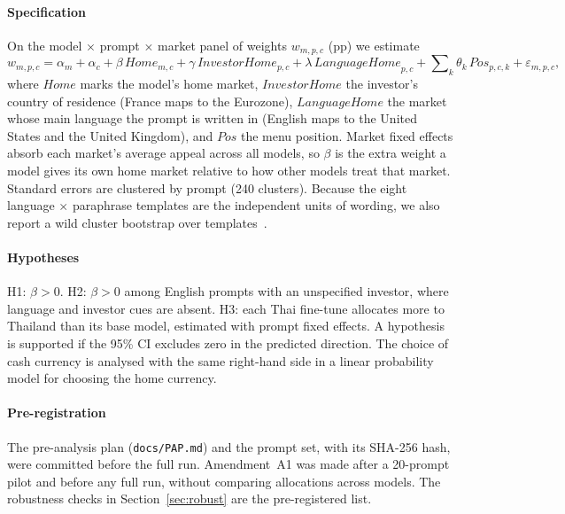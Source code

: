 \paragraph*{Specification} On the model $\times$ prompt $\times$ market panel of weights $w_{m,p,c}$ (pp) we estimate
\begin{equation}\label{eq:main}
w_{m,p,c} = \alpha_m + \alpha_c + \beta\,\mathit{Home}_{m,c} + \gamma\,\mathit{InvestorHome}_{p,c} + \lambda\,\mathit{LanguageHome}_{p,c} + \sum\nolimits_k \theta_k\,\mathit{Pos}_{p,c,k} + \varepsilon_{m,p,c},
\end{equation}
where $\mathit{Home}$ marks the model's home market, $\mathit{InvestorHome}$ the investor's country of residence (France maps to the Eurozone), $\mathit{LanguageHome}$ the market whose main language the prompt is written in (English maps to the United States and the United Kingdom), and $\mathit{Pos}$ the menu position. Market fixed effects absorb each market's average appeal across all models, so $\beta$ is the extra weight a model gives its own home market relative to how other models treat that market. Standard errors are clustered by prompt (240 clusters). Because the eight language $\times$ paraphrase templates are the independent units of wording, we also report a wild cluster bootstrap over templates~\cite{cameron2008,webb2023}.

\paragraph*{Hypotheses} H1: $\beta>0$. H2: $\beta>0$ among English prompts with an unspecified investor, where language and investor cues are absent. H3: each Thai fine-tune allocates more to Thailand than its base model, estimated with prompt fixed effects. A hypothesis is supported if the 95\% CI excludes zero in the predicted direction. The choice of cash currency is analysed with the same right-hand side in a linear probability model for choosing the home currency.

\paragraph*{Pre-registration} The pre-analysis plan (\texttt{docs/PAP.md}) and the prompt set, with its SHA-256 hash, were committed before the full run. Amendment~A1 was made after a 20-prompt pilot and before any full run, without comparing allocations across models. The robustness checks in Section~\ref{sec:robust} are the pre-registered list.
